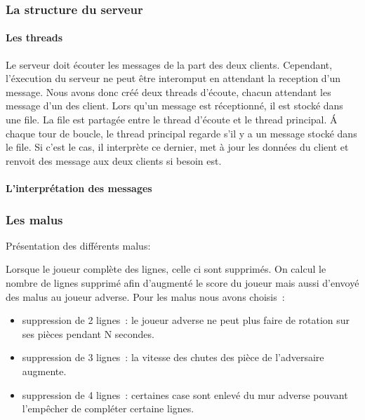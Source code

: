 \documentclass[a4paper, 12pt]{article}
\begin{document}
		\subsubsection{La structure du serveur}

			\paragraph{Les threads}

			Le serveur doit écouter les messages de la part des deux clients. Cependant, l'éxecution du serveur ne peut être interomput en attendant la reception d'un message. Nous avons donc créé deux threads d'écoute, chacun attendant les message d'un des client. Lors qu'un message est réceptionné, il est stocké dans une file. La file est partagée entre le thread d'écoute et le thread principal. \'A chaque tour de boucle, le thread principal regarde s'il y a un message stocké dans le file. Si c'est le cas, il interprète ce dernier, met à jour les données du client et renvoit des message aux deux clients si besoin est.


			\paragraph{L'interprétation des messages}

				


		\subsubsection{Les malus}


			Présentation des différents malus:

			Lorsque le joueur complète des lignes, celle ci sont supprimés. On calcul le nombre de lignes supprimé afin d’augmenté le score du joueur mais aussi d’envoyé des malus au joueur adverse.
			Pour les malus nous avons choisis : 

			\begin{itemize}
				\item suppression de 2 lignes : le joueur adverse ne peut plus faire de rotation sur ses pièces pendant N secondes.
				\item suppression de 3 lignes : la vitesse des chutes des pièce de l’adversaire augmente.
				\item suppression de 4 lignes : certaines case sont enlevé du mur adverse pouvant l’empêcher de compléter certaine lignes.
			\end{itemize}
\end{document}
